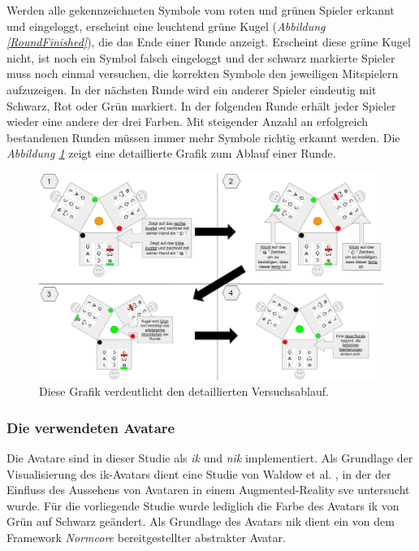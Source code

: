 \documentclass[a4paper,11pt]{article}%
\renewcommand{\\}{\vspace*{0.5\baselineskip} \newline}
\begin{document}
Werden alle gekennzeichneten Symbole vom roten und grünen Spieler erkannt und eingeloggt, erscheint eine leuchtend grüne Kugel (\textit{Abbildung \ref{RoundFinished}}), die das Ende einer Runde anzeigt. Erscheint diese grüne Kugel nicht, ist noch ein Symbol falsch eingeloggt und der schwarz markierte Spieler muss noch einmal versuchen, die korrekten Symbole den jeweiligen Mitspielern aufzuzeigen. 
In der nächsten Runde wird ein anderer Spieler eindeutig mit Schwarz, Rot oder Grün markiert.
In der folgenden Runde erhält jeder Spieler wieder eine andere der drei Farben. Mit steigender Anzahl an erfolgreich bestandenen Runden müssen immer mehr Symbole richtig erkannt werden. 
Die \textit{Abbildung \ref{DetaillierterVersuchsablauf}} zeigt eine detaillierte Grafik zum Ablauf einer Runde.

	\begin{figure}[h]
		\begin{footnotesize}
		\centering
			\includegraphics[scale=0.30]{Abbildungen/DetaillierterVersuchsablauf.JPG}		
			\caption[Darstellung des Versuchsablaufs]{Diese Grafik verdeutlicht den detaillierten Versuchsablauf.}
			\label{DetaillierterVersuchsablauf}
		\end{footnotesize}
	\end{figure}

	\subsubsection{Die verwendeten Avatare}
\label{IKNIK}
Die Avatare sind in dieser Studie als \textit{\ac{ik}} und \textit{\ac{nik}} implementiert. Als Grundlage der Visualisierung des \ac{ik}-Avatars dient eine Studie von Waldow et al. \cite{waldow2019investigating}, in der der Einfluss des Aussehens von Avataren in einem Augmented-Reality \ac{sve} untersucht wurde. Für die vorliegende Studie wurde lediglich die Farbe des Avatars \ac{ik} von Grün auf Schwarz geändert. 
Als Grundlage des Avatars \ac{nik} dient ein von dem Framework \textit{Normcore} bereitgestellter abstrakter Avatar.
\end{document}
